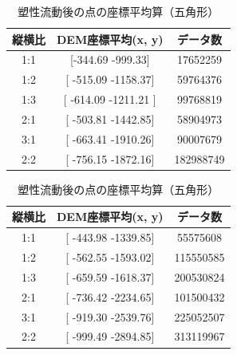 \documentclass[12pt]{ltjsarticle}
\begin{document}
\begin{table}[htbp]
  \begin{minipage}[c]{.5\textwidth}
    \centering
    \begin{tabular}{ccc} \hline
      縦横比 & DEM座標平均(x, y) & データ数\\\hline
      1:1 & [-344.69 -999.33] &  17652259 \\
      1:2 &[ -515.09 -1158.37] & 59764376 \\
      1:3 & [ -614.09 -1211.21 ] & 99768819 \\ 
      2:1 & [ -503.81 -1442.85] & 58904973 \\
      3:1 & [ -663.41 -1910.26] & 90007679 \\
      2:2 & [ -756.15 -1872.16]& 182988749 \\
    \end{tabular}
    \caption{塑性流動後の点の座標平均算（四角形）}
  \end{minipage}
  \begin{minipage}[c]{0.5\textwidth}
    \centering
    \begin{tabular}{ccc} \hline
      縦横比 & DEM座標平均(x, y) & データ数\\\hline
      1:1 & [ -443.98 -1339.85] & 55575608 \\
      1:2 & [ -562.55 -1593.02]& 115550585 \\
      1:3 & [ -659.59 -1618.37] & 200530824 \\ 
      2:1 & [ -736.42 -2234.65] & 101500432 \\
      3:1 & [ -919.30 -2539.76] & 225052507 \\
      2:2 & [ -999.49 -2894.85] & 313119967 \\
    \end{tabular}
    \caption{塑性流動後の点の座標平均算（五角形）}
  \end{minipage} \\
\end{table}
\end{document}
